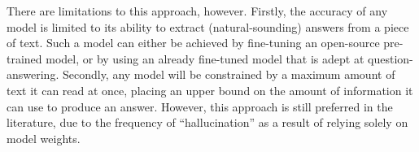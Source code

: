 There are limitations to this approach, however. Firstly, the accuracy of any model is limited to its ability to extract (natural-sounding) answers from a piece of text. Such a model can either be achieved by fine-tuning an open-source pre-trained model, or by using an already fine-tuned model that is adept at question-answering. Secondly, any model will be constrained by a maximum amount of text it can read at once, placing an upper bound on the amount of information it can use to produce an answer. However, this approach is still preferred in the literature, due to the frequency of ``hallucination'' as a result of relying solely on model weights.







